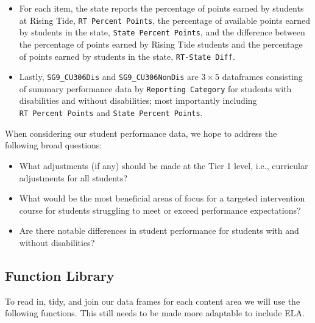 \documentclass[
  letterpaper,
  DIV=11,
  numbers=noendperiod]{scrartcl}
\begin{document}
\begin{itemize}
\item
  For each item, the state reports the percentage of points earned by
  students at Rising Tide, \texttt{RT\ Percent\ Points}, the percentage
  of available points earned by students in the state,
  \texttt{State\ Percent\ Points}, and the difference between the
  percentage of points earned by Rising Tide students and the percentage
  of points earned by students in the state, \texttt{RT-State\ Diff}.
\item
  Lastly, \texttt{SG9\_CU306Dis} and \texttt{SG9\_CU306NonDis} are
  \(3 \times 5\) dataframes consisting of summary performance data by
  \texttt{Reporting\ Category} for students with disabilities and
  without disabilities; most importantly including
  \texttt{RT\ Percent\ Points} and \texttt{State\ Percent\ Points}.
\end{itemize}

When considering our student performance data, we hope to address the
following broad questions:

\begin{itemize}
\item
  What adjustments (if any) should be made at the Tier 1 level, i.e.,
  curricular adjustments for all students?
\item
  What would be the most beneficial areas of focus for a targeted
  intervention course for students struggling to meet or exceed
  performance expectations?
\item
  Are there notable differences in student performance for students with
  and without disabilities?
\end{itemize}

\hypertarget{function-library}{%
\subsection{Function Library}\label{function-library}}

To read in, tidy, and join our data frames for each content area we will
use the following functions. This still needs to be made more adaptable
to include ELA.
\end{document}

